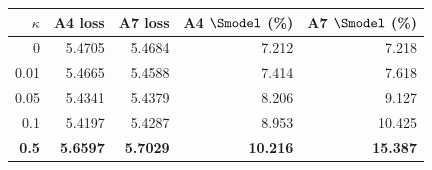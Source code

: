 \begin{tabular}{@{}rrrrr@{}}
\toprule
$\kappa$ & A4 loss & A7 loss & A4 $\Smodel$ (\%) & A7 $\Smodel$ (\%) \\
\midrule
0 & 5.4705 & 5.4684 & 7.212 & 7.218 \\
0.01 & 5.4665 & 5.4588 & 7.414 & 7.618 \\
0.05 & 5.4341 & 5.4379 & 8.206 & 9.127 \\
0.1 & 5.4197 & 5.4287 & 8.953 & 10.425 \\
\textbf{0.5} & \textbf{5.6597} & \textbf{5.7029} & \textbf{10.216} & \textbf{15.387} \\
\bottomrule
\end{tabular}
